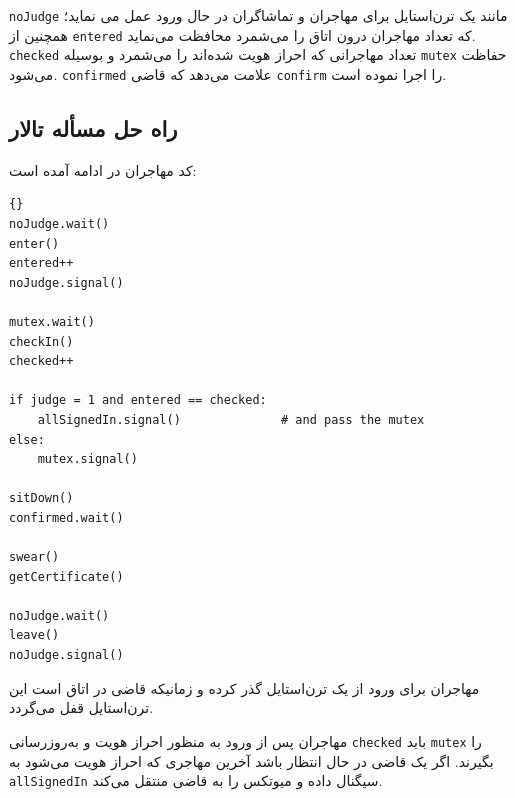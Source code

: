 \documentclass{book}
\newcommand{\clearemptydoublepage}{\newpage\cleardoublepage}
\begin{document}

    {\tt noJudge} 
    مانند یک ترن‌استایل برای مهاجران و تماشاگران در حال ورود عمل می نماید؛ همچنین از {\tt entered} که تعداد مهاجران درون اتاق را می‌شمرد 
    محافظت می‌نماید.  {\tt checked} تعداد مهاجرانی که احراز هویت شده‌اند را می‌شمرد و بوسیله {\tt mutex} حفاظت می‌شود. 
    {\tt confirmed}
    علامت می‌دهد که قاضی {\tt confirm} را اجرا نموده است. 

\clearemptydoublepage
\subsection{راه حل مسأله تالار }

    کد مهاجران در ادامه آمده است:

\begin{latin}
\begin{lstlisting}[title=\rl{راهنمایی مسأله تالار \lr{Faneuil} (مهاجر)}]{}
noJudge.wait()
enter()
entered++
noJudge.signal()

mutex.wait()
checkIn()
checked++

if judge = 1 and entered == checked:
    allSignedIn.signal()              # and pass the mutex
else:
    mutex.signal()

sitDown()
confirmed.wait()

swear()
getCertificate()

noJudge.wait()
leave()
noJudge.signal()
\end{lstlisting}
\end{latin}

    مهاجران برای ورود از یک ترن‌استایل گذر کرده و زمانیکه قاضی در اتاق است این ترن‌استایل قفل می‌گردد.

    مهاجران پس از ورود به منظور احراز هویت و به‌روزرسانی {\tt checked} باید  {\tt mutex} را بگیرند. اگر یک قاضی در حال انتظار باشد  آخرین مهاجری 
    که احراز هویت می‌شود به  {\tt allSignedIn} سیگنال داده و میوتکس را به قاضی منتقل می‌کند. 
\end{document}

